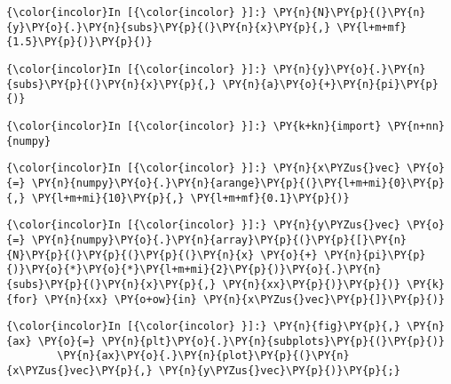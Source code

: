     \begin{Verbatim}[commandchars=\\\{\}]
{\color{incolor}In [{\color{incolor} }]:} \PY{n}{N}\PY{p}{(}\PY{n}{y}\PY{o}{.}\PY{n}{subs}\PY{p}{(}\PY{n}{x}\PY{p}{,} \PY{l+m+mf}{1.5}\PY{p}{)}\PY{p}{)}
\end{Verbatim}



    \begin{Verbatim}[commandchars=\\\{\}]
{\color{incolor}In [{\color{incolor} }]:} \PY{n}{y}\PY{o}{.}\PY{n}{subs}\PY{p}{(}\PY{n}{x}\PY{p}{,} \PY{n}{a}\PY{o}{+}\PY{n}{pi}\PY{p}{)}
\end{Verbatim}



    \begin{Verbatim}[commandchars=\\\{\}]
{\color{incolor}In [{\color{incolor} }]:} \PY{k+kn}{import} \PY{n+nn}{numpy}
\end{Verbatim}

    \begin{Verbatim}[commandchars=\\\{\}]
{\color{incolor}In [{\color{incolor} }]:} \PY{n}{x\PYZus{}vec} \PY{o}{=} \PY{n}{numpy}\PY{o}{.}\PY{n}{arange}\PY{p}{(}\PY{l+m+mi}{0}\PY{p}{,} \PY{l+m+mi}{10}\PY{p}{,} \PY{l+m+mf}{0.1}\PY{p}{)}
\end{Verbatim}

    \begin{Verbatim}[commandchars=\\\{\}]
{\color{incolor}In [{\color{incolor} }]:} \PY{n}{y\PYZus{}vec} \PY{o}{=} \PY{n}{numpy}\PY{o}{.}\PY{n}{array}\PY{p}{(}\PY{p}{[}\PY{n}{N}\PY{p}{(}\PY{p}{(}\PY{p}{(}\PY{n}{x} \PY{o}{+} \PY{n}{pi}\PY{p}{)}\PY{o}{*}\PY{o}{*}\PY{l+m+mi}{2}\PY{p}{)}\PY{o}{.}\PY{n}{subs}\PY{p}{(}\PY{n}{x}\PY{p}{,} \PY{n}{xx}\PY{p}{)}\PY{p}{)} \PY{k}{for} \PY{n}{xx} \PY{o+ow}{in} \PY{n}{x\PYZus{}vec}\PY{p}{]}\PY{p}{)}
\end{Verbatim}

    \begin{Verbatim}[commandchars=\\\{\}]
{\color{incolor}In [{\color{incolor} }]:} \PY{n}{fig}\PY{p}{,} \PY{n}{ax} \PY{o}{=} \PY{n}{plt}\PY{o}{.}\PY{n}{subplots}\PY{p}{(}\PY{p}{)}
        \PY{n}{ax}\PY{o}{.}\PY{n}{plot}\PY{p}{(}\PY{n}{x\PYZus{}vec}\PY{p}{,} \PY{n}{y\PYZus{}vec}\PY{p}{)}\PY{p}{;}
\end{Verbatim}



